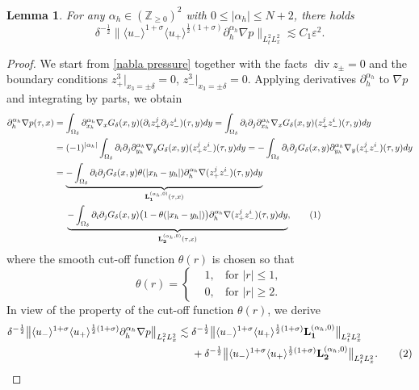 \documentclass[10pt,reqno]{amsart}
\numberwithin{equation}{section}
\newtheorem{lemma}[theorem]{Lemma}
\begin{document}
\begin{lemma}\label{lemma:H}
	For any $\alpha_h\in(\mathbb{Z}_{\geqslant 0})^2$ with 
	$0\leqslant|\alpha_h|\leqslant N+2$, there holds 
	\begin{equation*}
		\delta^{-\frac{1}{2}}\big\|\langle u_-\rangle^{1+\sigma}\langle u_+\rangle^{\frac{1}{2}(1+\sigma)}\partial_{h}^{\alpha_h} \nabla p\big\|_{L^2_tL^2_x}
		\lesssim C_1\varepsilon^2.
	\end{equation*}
\end{lemma}
\begin{proof}
	We start from \eqref{nabla pressure} together with the facts $\operatorname{div}z_{\pm}=0$ and the boundary conditions $z^3_{+}|_{x_3=\pm\delta}=0$, $z^3_{-}|_{x_3=\pm\delta}=0$. 
	Applying derivatives $\partial_h^{\alpha_h}$ to $\nabla p$ and 	integrating by parts, we obtain
	\begin{align*}
		\partial_h^{\alpha_h} \nabla p(\tau,x)
		&=\int_{\Omega_\delta} \partial_{x_h}^{\alpha_h} \nabla_x G_\delta(x,y)(\partial_iz_+^j\partial_jz_-^i)(\tau,y)dy
		=\int_{\Omega_\delta} \partial_i\partial_j\partial_{x_h}^{\alpha_h} \nabla_x G_\delta(x,y)(z_+^jz_-^i)(\tau,y)dy\\
		&=(-1)^{|\alpha_h|}\int_{\Omega_\delta}\partial_i\partial_j \partial_{y_h}^{\alpha_h} \nabla_yG_\delta(x,y)(z_+^jz_-^i)(\tau,y)dy
		=-\int_{\Omega_\delta}\partial_i\partial_j G_\delta(x,y)\partial_{y_h}^{\alpha_h}\nabla_y(z_+^jz_-^i)(\tau,y)dy\\
		&=\underbrace{-\int_{\Omega_\delta}\partial_i\partial_j G_\delta(x,y)\theta(|x_h-y_h|)\partial_{h}^{\alpha_h}\nabla(z_+^jz_-^i)(\tau,y)dy}_{\mathbf{L}_{\mathbf{1}}^{(\alpha_h,0)}(\tau,x)}\\
		&\ \ \ \ \underbrace{-\int_{\Omega_\delta}\partial_i\partial_j G_\delta(x,y)\big(1-\theta(|x_h-y_h|)\big)\partial_{h}^{\alpha_h}\nabla(z_+^jz_-^i)(\tau,y)dy}_{\mathbf{L}_{\mathbf{2}}^{(\alpha_h,0)}(\tau,x)},\stepcounter{equation}\tag{\theequation}\label{partialp-decomposition}
	\end{align*} 
	where the smooth cut-off function $\theta(r)$ is chosen so that
	\begin{equation}\label{cutoff}
		\theta(r)=\begin{cases}
			&	1,\ \ \ \ \text{for }|r|\leqslant 1,\\
			&	0,\ \ \ \ \text{for }|r|\geqslant 2.
		\end{cases}
	\end{equation} 
	In view of the property of the cut-off function $\theta(r)$, we derive 
	\begin{align*}
		\delta^{-\frac{1}{2}}\big\|\langle u_-\rangle^{1+\sigma}\langle u_+\rangle^{\frac{1}{2}(1+\sigma)}\partial_h^{\alpha_h}\nabla p\big\|_{L^2_tL^2_x}&\lesssim \delta^{-\frac{1}{2}}\big\|\langle u_-\rangle^{1+\sigma}\langle u_+\rangle^{\frac{1}{2}(1+\sigma)}\mathbf{L}_{\mathbf{1}}^{(\alpha_h,0)}\big\|_{L^2_tL^2_x}\\
		&\ \ \ \ +\delta^{-\frac{1}{2}}\big\|\langle u_-\rangle^{1+\sigma}\langle u_+\rangle^{\frac{1}{2}(1+\sigma)}\mathbf{L}_{\mathbf{2}}^{(\alpha_h,0)}\big\|_{L^2_tL^2_x}.\stepcounter{equation}\tag{\theequation}\label{eq:H1H2}
	\end{align*}
	

\end{proof}
\end{document}
